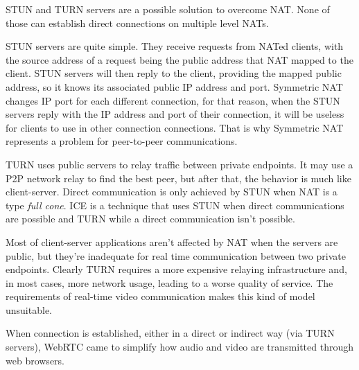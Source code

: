 \ac{STUN} and \ac{TURN} \cite{natvoip} servers are a possible solution to overcome \ac{NAT}. None of those can establish direct connections on multiple level \ac{NAT}s.

\ac{STUN} servers are quite simple. They receive requests from \ac{NAT}ed clients, with the source address of a request being the public address that \ac{NAT} mapped to the client. \ac{STUN} servers will then reply to the client, providing the mapped public address, so it knows its associated public \ac{IP} address and port. Symmetric \ac{NAT} changes \ac{IP} port for each different connection, for that reason, when the \ac{STUN} servers reply with the \ac{IP} address and port of their connection, it will be useless for clients to use in other connection connections. That is why Symmetric \ac{NAT} represents a problem for peer-to-peer communications.   

\ac{TURN} uses public servers to relay traffic between private endpoints.
It may use a \ac{P2P} network relay to find the best peer, but after that, the behavior is much like client-server. Direct communication is only achieved by \ac{STUN} when \ac{NAT} is a type \emph{full cone}. \ac{ICE} is a technique that uses \ac{STUN} when direct communications are possible and \ac{TURN} while a direct communication isn't possible.

Most of client-server applications aren't affected by \ac{NAT} when the servers are public, but they're inadequate for real time communication between two private endpoints. Clearly \ac{TURN} requires a more expensive relaying infrastructure and, in most cases, more network usage, leading to a worse quality of service. The requirements of real-time video communication makes this kind of model unsuitable.


When connection is established, either in a direct or indirect way (via \ac{TURN} servers), \ac{WebRTC} came to simplify how audio and video are transmitted through web browsers.

